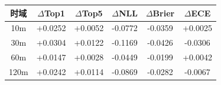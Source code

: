 \begin{tabular}{cccccc}
\toprule
时域 & $\Delta$Top1 & $\Delta$Top5 & $\Delta$NLL & $\Delta$Brier & $\Delta$ECE \\
\midrule
10m & +0.0252 & +0.0052 & -0.0772 & -0.0359 & +0.0025 \\
30m & +0.0304 & +0.0122 & -0.1169 & -0.0426 & -0.0306 \\
60m & +0.0147 & +0.0028 & -0.0449 & -0.0199 & +0.0042 \\
120m & +0.0242 & +0.0114 & -0.0869 & -0.0282 & -0.0067 \\
\bottomrule
\end{tabular}
